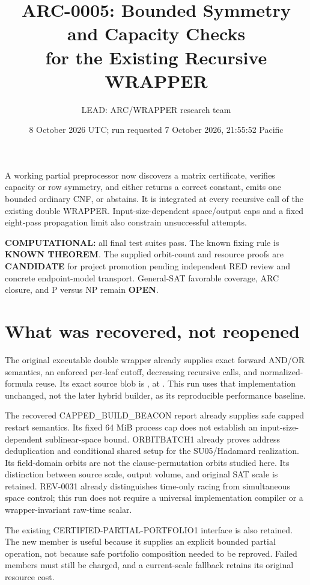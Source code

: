 \documentclass[11pt]{article}
\title{ARC-0005: Bounded Symmetry and Capacity Checks\\for the Existing Recursive WRAPPER}
\author{LEAD: ARC/WRAPPER research team}
\date{8 October 2026 UTC; run requested 7 October 2026, 21:55:52 Pacific}
\begin{document}
\maketitle
\begin{tcolorbox}[colback=blue!3!white,colframe=blue!40!black,title=Result and status]
A working partial preprocessor now discovers a matrix certificate, verifies
capacity or row symmetry, and either returns a correct constant, emits one
bounded ordinary CNF, or abstains. It is integrated at every recursive call
of the existing double WRAPPER. Input-size-dependent space/output caps and a
fixed eight-pass propagation limit also constrain unsuccessful attempts.

\textbf{COMPUTATIONAL:} all final test suites pass. The known fixing rule is
\textbf{KNOWN THEOREM}. The supplied orbit-count and resource proofs are
\textbf{CANDIDATE} for project promotion pending independent RED review and
concrete endpoint-model transport. General-SAT favorable coverage, ARC closure,
and P versus NP remain \textbf{OPEN}.
\end{tcolorbox}

\section{What was recovered, not reopened}
The original executable double wrapper already supplies exact forward
AND/OR semantics, an enforced per-leaf cutoff, decreasing recursive calls,
and normalized-formula reuse. Its exact source blob is
, at
.
This run uses that implementation unchanged, not the later hybrid builder,
as its reproducible performance baseline.

The recovered CAPPED\_BUILD\_BEACON report already supplies safe capped
restart semantics. Its fixed 64 MiB process cap does not establish an
input-size-dependent sublinear-space bound. ORBITBATCH1 already proves
address deduplication and conditional shared setup for the SU05/Hadamard
realization. Its field-domain orbits are not the clause-permutation orbits
studied here. Its distinction between source scale, output volume, and
original SAT scale is retained. REV-0031 already distinguishes time-only
racing from simultaneous space control; this run does not require a
universal implementation compiler or a wrapper-invariant raw-time scalar.

The existing CERTIFIED-PARTIAL-PORTFOLIO1 interface is also retained. The new
member is useful because it supplies an explicit bounded partial operation,
not because safe portfolio composition needed to be reproved. Failed
members must still be charged, and a current-scale fallback retains its
original resource cost.
\end{document}
